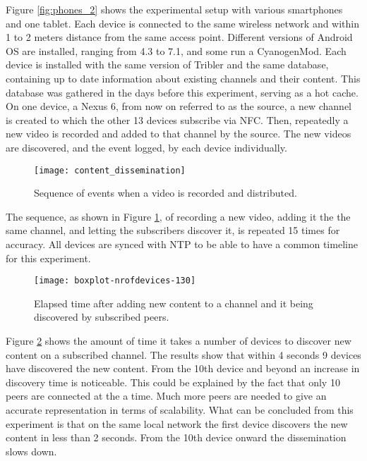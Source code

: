 Figure \ref{fig:phones_2} shows the experimental setup with various smartphones and one tablet.
Each device is connected to the same wireless network and within 1 to 2 meters distance from the same access point.
Different versions of Android OS are installed, ranging from 4.3 to 7.1, and some run a CyanogenMod.
Each device is installed with the same version of Tribler and the same database, containing up to date information about existing channels and their content.
This database was gathered in the days before this experiment, serving as a hot cache.
On one device, a Nexus 6, from now on referred to as the source, a new channel is created to which the other 13 devices subscribe via NFC.
Then, repeatedly a new video is recorded and added to that channel by the source.
The new videos are discovered, and the event logged, by each device individually.
\begin{figure}[H]
	\centering
	\texttt{[image: content\_dissemination]}
	\caption{Sequence of events when a video is recorded and distributed.}
	\label{fig:content_dissemination}
\end{figure}
The sequence, as shown in Figure \ref{fig:content_dissemination}, of recording a new video, adding it the the same channel, and letting the subscribers discover it, is repeated 15 times for accuracy.
All devices are synced with NTP to be able to have a common timeline for this experiment.

\begin{figure}[H]
	\centering %
	\texttt{[image: boxplot-nrofdevices-130]}
	\caption{Elapsed time after adding new content to a channel and it being discovered by subscribed peers.}
	\label{fig:boxplot-nr.of.devices-130}
\end{figure}
Figure \ref{fig:boxplot-nr.of.devices-130} shows the amount of time it takes a number of devices to discover new content on a subscribed channel.
The results show that within 4 seconds 9 devices have discovered the new content.
From the 10th device and beyond an increase in discovery time is noticeable.
This could be explained by the fact that only 10 peers are connected at the a time.
Much more peers are needed to give an accurate representation in terms of scalability.
What can be concluded from this experiment is that on the same local network the first device discovers the new content in less than 2 seconds.
From the 10th device onward the dissemination slows down.


